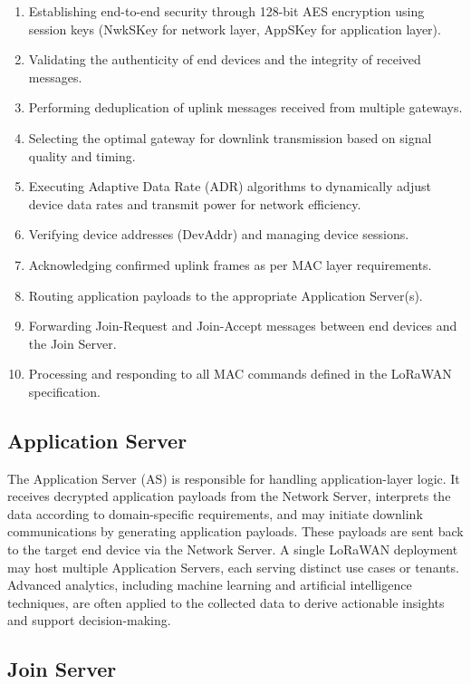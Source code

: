 \begin{enumerate}
    \item Establishing end-to-end security through 128-bit AES encryption using session keys (NwkSKey for network layer, AppSKey for application layer).
    \item Validating the authenticity of end devices and the integrity of received messages.
    \item Performing deduplication of uplink messages received from multiple gateways.
    \item Selecting the optimal gateway for downlink transmission based on signal quality and timing.
    \item Executing Adaptive Data Rate (ADR) algorithms to dynamically adjust device data rates and transmit power for network efficiency.
    \item Verifying device addresses (DevAddr) and managing device sessions.
    \item Acknowledging confirmed uplink frames as per MAC layer requirements.
    \item Routing application payloads to the appropriate Application Server(s).
    \item Forwarding Join-Request and Join-Accept messages between end devices and the Join Server.
    \item Processing and responding to all MAC commands defined in the LoRaWAN specification.
\end{enumerate}

\subsection{Application Server}

The Application Server (AS) is responsible for handling application-layer logic. It receives decrypted application payloads from the Network Server, interprets the data according to domain-specific requirements, and may initiate downlink communications by generating application payloads. These payloads are sent back to the target end device via the Network Server. A single LoRaWAN deployment may host multiple Application Servers, each serving distinct use cases or tenants. Advanced analytics, including machine learning and artificial intelligence techniques, are often applied to the collected data to derive actionable insights and support decision-making.

\subsection{Join Server}


